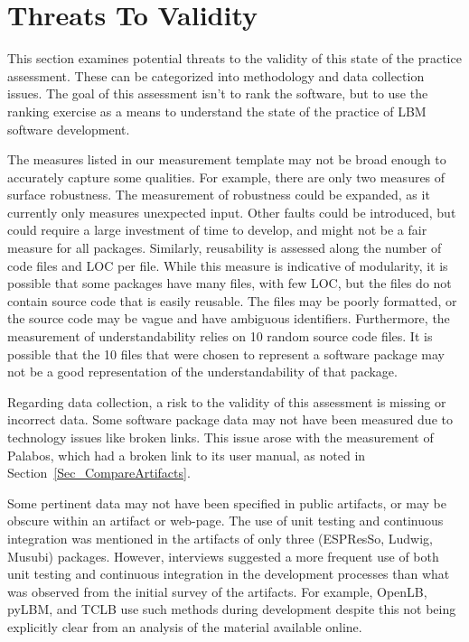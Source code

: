\documentclass[runningheads]{llncs}
\begin{document}
\section{Threats To Validity} \label{threats}

This section examines potential threats to the validity of this state of the
practice assessment. These can be categorized into methodology and data
collection issues. The goal of this assessment isn't to rank the software, but
to use the ranking exercise as a means to understand the state of the practice
of LBM software development.

The measures listed in our measurement template may not be broad enough to
accurately capture some qualities. For example, there are only two measures of
surface robustness. The measurement of robustness could be expanded, as it
currently only measures unexpected input. Other faults could be introduced, but
could require a large investment of time to develop, and might not be a fair
measure for all packages. Similarly, reusability is assessed along the number of
code files and LOC per file. While this measure is indicative of modularity, it
is possible that some packages have many files, with few LOC, but the files do
not contain source code that is easily reusable. The files may be poorly
formatted, or the source code may be vague and have ambiguous identifiers.
Furthermore, the measurement of understandability relies on 10 random source
code files. It is possible that the 10 files that were chosen to represent a
software package may not be a good representation of the understandability of
that package.

Regarding data collection, a risk to the validity of this assessment is missing
or incorrect data. Some software package data may not have been measured due to
technology issues like broken links. This issue arose with the measurement of
Palabos, which had a broken link to its user manual, as noted in
Section~\ref{Sec_CompareArtifacts}. 

Some pertinent data may not have been specified in public artifacts, or may be
obscure within an artifact or web-page. The use of unit testing and continuous
integration was mentioned in the artifacts of only three (ESPResSo, Ludwig,
Musubi) packages. However, interviews suggested a more frequent use of both unit
testing and continuous integration in the development processes than what was
observed from the initial survey of the artifacts. For example, OpenLB, pyLBM,
and TCLB use such methods during development despite this not being explicitly
clear from an analysis of the material available online. 
\end{document}
